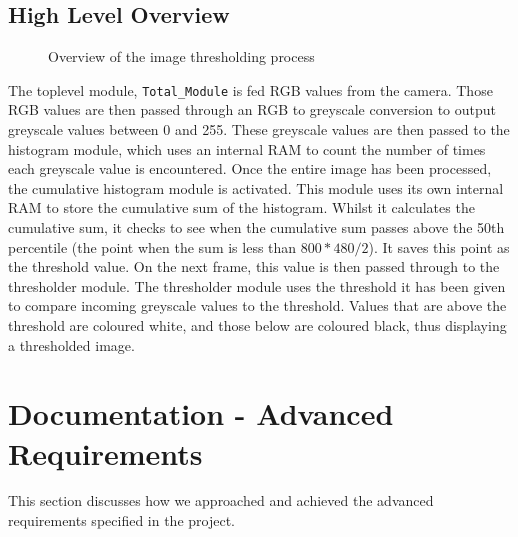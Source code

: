 \documentclass[12pt]{article}
\begin{document}
  \subsection{High Level Overview}
  \begin{figure}[H]
    \caption{Overview of the image thresholding process}
    \label{fig:histogram_overview}
  \end{figure}
  
  The toplevel module, \texttt{Total\_Module} is fed RGB values from the camera. Those RGB values are then passed through an RGB to greyscale conversion to output greyscale values between 0 and 255. These greyscale values are then passed to the histogram module, which uses an internal RAM to count the number of times each greyscale value is encountered. Once the entire image has been processed, the cumulative histogram module is activated. This module uses its own internal RAM to store the cumulative sum of the histogram. Whilst it calculates the cumulative sum, it checks to see when the cumulative sum passes above the 50th percentile (the point when the sum is less than \(800*480/2\)). It saves this point as the threshold value. On the next frame, this value is then passed through to the thresholder module. The thresholder module uses the threshold it has been given to compare incoming greyscale values to the threshold. Values that are above the threshold are coloured white, and those below are coloured black, thus displaying a thresholded image.
  
  \section{Documentation - Advanced Requirements}
  This section discusses how we approached and achieved the advanced requirements specified in the project.
  
\end{document}
